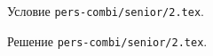 \problem
Условие \texttt{pers-combi/senior/2.tex}.

\solution Решение \texttt{pers-combi/senior/2.tex}.
\endproblem
